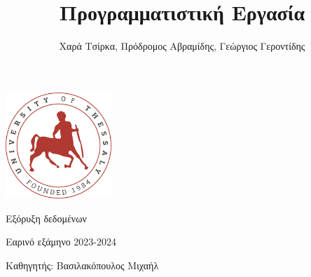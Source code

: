 \documentclass{article}
\title{\Huge Προγραμματιστική Εργασία}
\author {\Large Χαρά Τσίρκα, Πρόδρομος Αβραμίδης, Γεώργιος Γεροντίδης}
\begin{document}
\maketitle
\begin{center}
\vspace{1cm}
\includegraphics[width=0.3\textwidth]{images/uthlogo.png}
\vspace{2cm}
\end{center}
\begin{center}
  \Huge Εξόρυξη δεδομένων \vspace{1cm}

  \Large Εαρινό εξάμηνο 2023-2024 \vspace{1cm}

  \Large Καθηγητής: Βασιλακόπουλος Μιχαήλ
\end{center}
\end{document}
